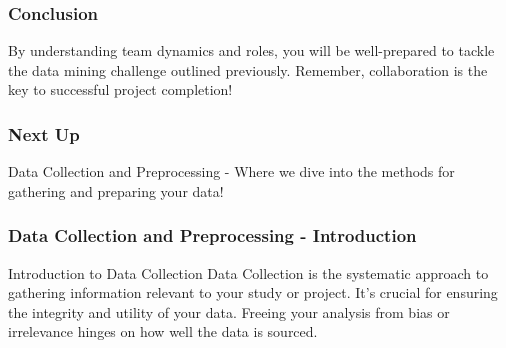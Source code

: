 \documentclass{beamer}
\begin{document}
\begin{frame}[fragile]
    \frametitle{Conclusion}
    By understanding team dynamics and roles, you will be well-prepared to tackle the data mining challenge outlined previously. 
    Remember, collaboration is the key to successful project completion!
\end{frame}

\begin{frame}[fragile]
    \frametitle{Next Up}
    Data Collection and Preprocessing - Where we dive into the methods for gathering and preparing your data!
\end{frame}

\begin{frame}[fragile]
    \frametitle{Data Collection and Preprocessing - Introduction}
    \begin{block}{Introduction to Data Collection}
        Data Collection is the systematic approach to gathering information relevant to your study or project. It’s crucial for ensuring the integrity and utility of your data. Freeing your analysis from bias or irrelevance hinges on how well the data is sourced.
    \end{block}
\end{frame}
\end{document}
